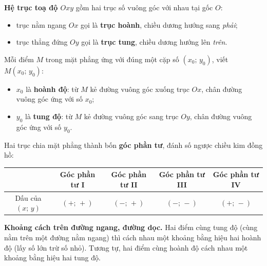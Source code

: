 \begin{knowbox}
\textbf{Hệ trục toạ độ $Oxy$} gồm hai trục số vuông góc với nhau tại gốc $O$:
\begin{itemize}[leftmargin=1.3em,itemsep=1pt,topsep=2pt]
  \item trục nằm ngang $Ox$ gọi là \textbf{trục hoành}, chiều dương hướng sang \emph{phải};
  \item trục thẳng đứng $Oy$ gọi là \textbf{trục tung}, chiều dương hướng lên \emph{trên}.
\end{itemize}
Mỗi điểm $M$ trong mặt phẳng ứng với đúng một cặp số $(x_0;\,y_0)$, viết $M(x_0;\,y_0)$:
\begin{itemize}[leftmargin=1.3em,itemsep=1pt,topsep=2pt]
  \item $x_0$ là \textbf{hoành độ}: từ $M$ kẻ đường vuông góc xuống trục $Ox$, chân đường vuông góc ứng với số $x_0$;
  \item $y_0$ là \textbf{tung độ}: từ $M$ kẻ đường vuông góc sang trục $Oy$, chân đường vuông góc ứng với số $y_0$.
\end{itemize}
Hai trục chia mặt phẳng thành bốn \textbf{góc phần tư}, đánh số ngược chiều kim đồng hồ:
\begin{center}
\begin{tabular}{|c|c|c|c|c|}
\hline
 & Góc phần tư I & Góc phần tư II & Góc phần tư III & Góc phần tư IV \\ \hline
Dấu của $(x;\,y)$ & $(+;\,+)$ & $(-;\,+)$ & $(-;\,-)$ & $(+;\,-)$ \\ \hline
\end{tabular}
\end{center}
\textbf{Khoảng cách trên đường ngang, đường dọc.} Hai điểm cùng tung độ (cùng nằm trên một đường nằm ngang) thì cách nhau một khoảng bằng hiệu hai hoành độ (lấy số lớn trừ số nhỏ). Tương tự, hai điểm cùng hoành độ cách nhau một khoảng bằng hiệu hai tung độ.
\end{knowbox}

